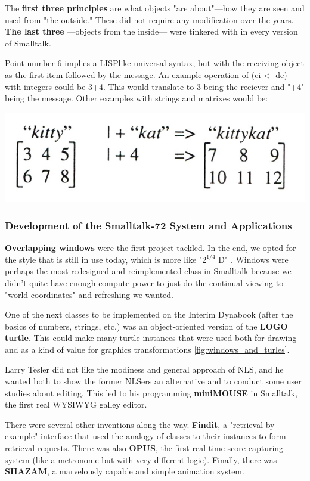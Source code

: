 \documentclass[letterpaper,12pt,parskip=full]{article}
\begin{document}
The \textbf{first three principles} are what objects "are about"—how they are seen and used from "the outside." These did not require any modification over the years. \textbf{The last three} —objects from the inside— were tinkered with in every version of Smalltalk.

 Point number 6 implies a LISPlike universal syntax, but with the receiving object as the first item followed by the message. An example operation of (ci <- de) with integers could be 3+4. This would translate to 3 being the reciever and  "+4" being the message. Other examples  with strings and matrixes would be:
 
\includegraphics[scale=0.3]{KITTYKAT.jpg}

\subsubsection{Development of the Smalltalk-72 System and Applications}

\textbf{Overlapping windows} were the first project tackled.	In the end, we opted for the style that is still in use today, which is more like "$2^{1/4}$ D" . Windows were perhaps the most redesigned and reimplemented class in Smalltalk because we didn't quite have enough compute power to just do the continual viewing to "world coordinates" and refreshing we wanted.

One of the next classes to be implemented on the Interim Dynabook (after the basics of numbers, strings, etc.) was an object-oriented version of the \textbf{LOGO turtle}. This could make many turtle instances that were used both for drawing and as a kind of value for graphics transformations \ref{fig:windows_and_turles}.

Larry Tesler did not like the modiness and general approach of NLS, and he wanted both to show the former NLSers an alternative and to conduct some user studies about editing. This led to his programming \textbf{miniMOUSE} in Smalltalk, the first real WYSIWYG galley editor.

There were several other inventions along the way. \textbf{Findit}, a "retrieval by example" interface that used the analogy of classes to their instances to form retrieval requests. There was also \textbf{OPUS}, the first real-time score capturing system (like a metronome but with very different logic). Finally, there was \textbf{SHAZAM}, a marvelously capable and simple animation system.
\end{document}

